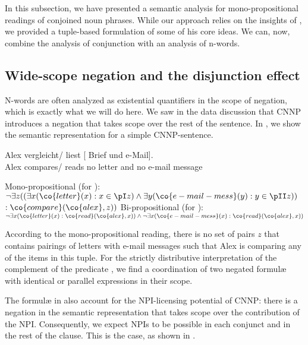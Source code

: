 \documentclass[output=paper]{langsci/langscibook}
\begin{document}
In this subsection, we have presented a semantic analysis for
mono-prop\-o\-si\-tional readings of conjoined noun phrases.  While our
approach relies on the insights of \citet{Chaves:07}, we provided a
tuple-based formulation of some of his core ideas.
We can, now, combine the analysis of conjunction with an analysis of
n-words.

\subsection{Wide-scope negation and the disjunction effect}
\label{Sec-DisjunctionEffect}

N-words are often analyzed as existential quantifiers in the scope of negation, which is exactly what we will do here. We saw in the data discussion that CNNP introduces a negation that takes scope over the rest of the sentence. 
In , we show the semantic representation for a simple CNNP-sentence.

\ea \label{alex-cnnp-lf}
\gll Alex vergleicht/ liest [ Brief und  e-Mail].\\
Alex compares/ reads no letter and no {e-mail message}\\
\begin{xlist}
\ex \label{alex-cnnp-mono}
Mono-propositional (for ): \\
$\lnot \exists z ((
\exists x (\co{letter}(x) : x \in \pI z)
\land 
\exists y (\co{e-mail-mess}(y): y \in \pII z))$\\
\qquad $: \co{compare}(\co{alex},z))$
\ex \label{alex-cnnp-bi}
Bi-propositional (for ): \\
$\lnot \exists x (\co{letter}(x) : \co{read}(\co{alex},x))
\land 
\lnot \exists x (\co{e-mail-mess}(x) : \co{read}(\co{alex},x))
$
\end{xlist}
\z

According to the mono-propositional reading, there is no set of pairs $z$ that contains pairings of letters with e-mail messages such that Alex is comparing any of the items in this tuple. 
%
For the strictly distributive interpretation of the complement of the predicate , we find a coordination of two negated formulæ with identical or parallel expressions in their scope.

The formulæ in  also account for the NPI-licensing potential of CNNP: 
there is a negation in the semantic representation that takes scope over the contribution of the NPI.
Consequently, we expect NPIs to be possible in each conjunct and in the rest of the clause. This is the case, as shown in . 
\end{document}
